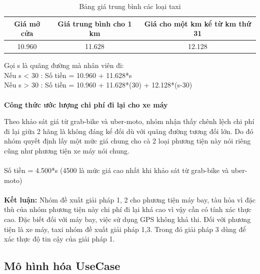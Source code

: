 \documentclass[a4paper]{article}
\begin{document}
\begin{itemize}
    \begin{table}[h]
        \centering
            \begin{tabular}{|c|c|c|}
            \hline
            \textbf{Giá mở cửa} & \textbf{Giá trung bình cho 1 km} & \textbf{Giá cho một km kể từ km thứ 31} \\
            \hline
            10.960 & 11.628 & 12.128\\
            \hline
            \end{tabular}
            \caption{Bảng giá trung bình các loại taxi}
    \end{table}  
    \par
    Gọi s là quãng đường mà nhân viên đi:\\
    Nếu s < 30 : Số tiền = 10.960 + 11.628*s\\
    Nếu s > 30 : Số tiền = 10.960 + 11.628*(30) + 12.128*(s-30)\\
    \\
    \textbf{Công thức ước lượng chi phí đi lại cho xe máy }  \par
    Theo khảo sát giá từ grab-bike và uber-moto, nhóm nhận thấy chênh lệch chi phí đi lại giữa 2 hãng là không đáng kể đối dù với quãng đường tương đối lớn. Do đó nhóm quyết định lấy một mức giá chung cho cà 2 loại phương tiện này nói riêng cũng như phương tiện xe máy nói chung.\\
    \\
    Số tiền = 4.500*s (4500 là mức giá cao nhất khi khảo sát từ grab-bike và uber-moto)\\
    \\
    \textbf{Kết luận:} Nhóm đề xuất giải pháp 1, 2 cho phương tiện máy bay, tàu hỏa vì đặc thù của nhóm phương tiện này chi phí đi lại khá cao vì vậy cần có tính xác thực cao. Đặc biết đối với máy bay, việc sử dụng GPS không khả thi. Đối với phương tiện là xe máy, taxi nhóm đề xuất giải pháp 1,3. Trong đó giải pháp 3 dùng để xác thực độ tin cậy của giải pháp 1.
\end{itemize}
\subsection{Mô hình hóa UseCase}
\end{document}
